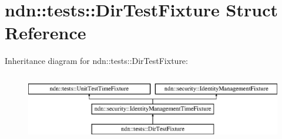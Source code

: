 \hypertarget{structndn_1_1tests_1_1DirTestFixture}{}\section{ndn\+:\+:tests\+:\+:Dir\+Test\+Fixture Struct Reference}
\label{structndn_1_1tests_1_1DirTestFixture}
Inheritance diagram for ndn\+:\+:tests\+:\+:Dir\+Test\+Fixture\+:\begin{figure}[H]
\begin{center}
\leavevmode
\includegraphics[height=3.000000cm]{structndn_1_1tests_1_1DirTestFixture}
\end{center}
\end{figure}
